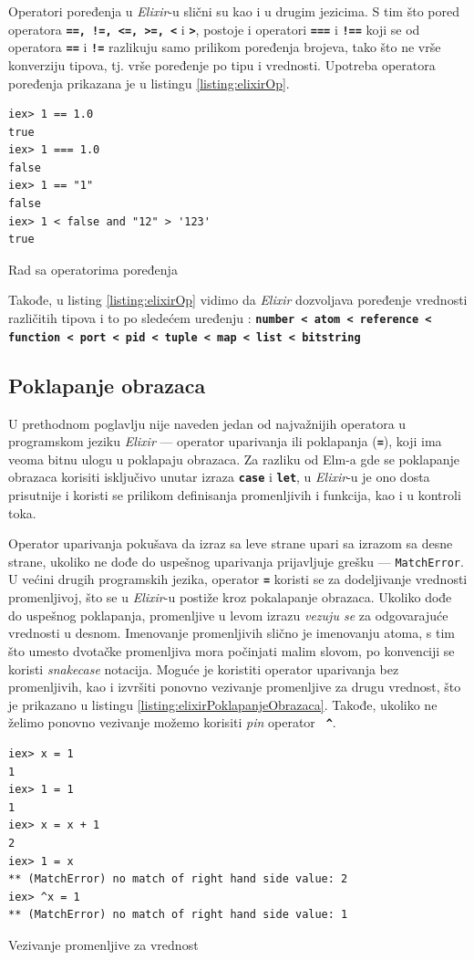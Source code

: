 \documentclass[12pt,oneside]{memoir}
\begin{document}
Operatori poređenja u \emph{Elixir}-u slični su kao i u drugim jezicima. S tim što pored operatora 
\texttt{\textbf{==, !=, <=, >=, <}} i \texttt{\textbf{>}}, postoje i operatori 
\texttt{\textbf{===}} i \texttt{\textbf{!==}} koji se od operatora \texttt{\textbf{==}} i
\texttt{\textbf{!=}} razlikuju samo prilikom poređenja brojeva, tako što ne vrše konverziju
tipova, tj. vrše poređenje po tipu i vrednosti. Upotreba operatora poređenja prikazana je u
listingu \ref{listing:elixirOp}.  
\begin{listing}[!h]
\begin{verbatim}
iex> 1 == 1.0
true
iex> 1 === 1.0
false
iex> 1 == "1"
false
iex> 1 < false and "12" > '123'
true
\end{verbatim}
\caption{Rad sa operatorima poređenja}
\label{listing:elixirOp}
\end{listing}

Takođe, u listing \ref{listing:elixirOp} vidimo da \emph{Elixir} dozvoljava poređenje vrednosti
različitih tipova i to po sledećem uređenju : \textbf{\texttt{number < atom < reference <
function < port < pid < tuple < map < list < bitstring}}

\subsection{Poklapanje obrazaca}
U prethodnom poglavlju nije naveden jedan od najvažnijih operatora u programskom jeziku
\emph{Elixir} ---  operator uparivanja ili poklapanja (\texttt{\textbf{=}}), koji ima veoma
bitnu ulogu u poklapaju obrazaca. Za razliku od Elm-a gde se
poklapanje obrazaca korisiti isključivo unutar izraza \textbf{\texttt{case}} i
\textbf{\texttt{let}}, u \emph{Elixir}-u je ono dosta prisutnije i koristi se prilikom
definisanja promenljivih i funkcija, kao i u kontroli toka.

Operator uparivanja pokušava da izraz sa leve strane upari sa izrazom sa desne strane,
ukoliko ne dođe do uspešnog uparivanja prijavljuje grešku --- \texttt{MatchError}.
U većini drugih programskih jezika, operator \texttt{\textbf{=}} koristi se za dodeljivanje
vrednosti promenljivoj, što se u \emph{Elixir}-u postiže kroz pokalapanje obrazaca. Ukoliko
dođe do uspešnog poklapanja, promenljive u levom izrazu \emph{vezuju se} za odgovarajuće
vrednosti u desnom. Imenovanje promenljivih slično je imenovanju atoma, s tim što umesto
dvotačke promenljiva mora počinjati malim slovom, po konvenciji se koristi
\emph{snake\textunderscore{}case} notacija. Moguće je koristiti operator uparivanja bez 
promenljivih, kao i izvršiti ponovno vezivanje promenljive za drugu vrednost, što je 
prikazano u listingu \ref{listing:elixirPoklapanjeObrazaca}. Takođe, ukoliko ne želimo
ponovno vezivanje možemo korisiti \emph{pin} operator \textbf{\texttt{ \^{}}}.  
\begin{listing}[!h]
\begin{verbatim}
iex> x = 1
1
iex> 1 = 1
1
iex> x = x + 1
2
iex> 1 = x  
** (MatchError) no match of right hand side value: 2
iex> ^x = 1
** (MatchError) no match of right hand side value: 1
\end{verbatim}
\caption{Vezivanje promenljive za vrednost}
\label{listing:elixirPoklapanjeObrazaca}
\end{listing}
\end{document}
